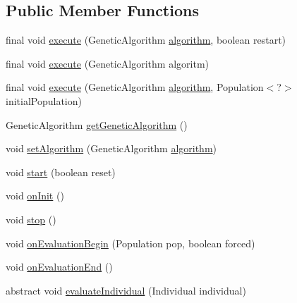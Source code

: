 \subsection*{Public Member Functions}
\begin{CompactItemize}
\item 
final void \hyperlink{classjenes_1_1utils_1_1multitasking_1_1_runner_24d074cbd5140cd8bc65623fa1961f39}{execute} (GeneticAlgorithm \hyperlink{classjenes_1_1utils_1_1multitasking_1_1_runner_699ccf526b6116f97abc09e4ce390c89}{algorithm}, boolean restart)
\item 
final void \hyperlink{classjenes_1_1utils_1_1multitasking_1_1_runner_e222d69f44508fc432c05074272e0ae3}{execute} (GeneticAlgorithm algoritm)
\item 
final void \hyperlink{classjenes_1_1utils_1_1multitasking_1_1_runner_7205f2d93d68f40e3e87dccf92cc3720}{execute} (GeneticAlgorithm \hyperlink{classjenes_1_1utils_1_1multitasking_1_1_runner_699ccf526b6116f97abc09e4ce390c89}{algorithm}, Population$<$?$>$ initialPopulation)
\item 
GeneticAlgorithm \hyperlink{classjenes_1_1utils_1_1multitasking_1_1_runner_462a121a840bbf06593bbd7da219d8b9}{getGeneticAlgorithm} ()
\item 
void \hyperlink{classjenes_1_1utils_1_1multitasking_1_1_runner_dad9fb400d736e55bcd3dfdf07742437}{setAlgorithm} (GeneticAlgorithm \hyperlink{classjenes_1_1utils_1_1multitasking_1_1_runner_699ccf526b6116f97abc09e4ce390c89}{algorithm})
\item 
void \hyperlink{classjenes_1_1utils_1_1multitasking_1_1_runner_5dc1ed49495150ff26ec5194010b00e4}{start} (boolean reset)
\item 
void \hyperlink{classjenes_1_1utils_1_1multitasking_1_1_runner_4c4d4a0cd7aec110d60da5c660903398}{onInit} ()
\item 
void \hyperlink{classjenes_1_1utils_1_1multitasking_1_1_runner_c89e8ac54daba2e326e687662ff9f7b0}{stop} ()
\item 
void \hyperlink{classjenes_1_1utils_1_1multitasking_1_1_runner_6ec13cf0fb2ff03461a3a397421505cf}{onEvaluationBegin} (Population pop, boolean forced)
\item 
void \hyperlink{classjenes_1_1utils_1_1multitasking_1_1_runner_82c84ad942296d62849248b107ec3a2c}{onEvaluationEnd} ()
\item 
abstract void \hyperlink{classjenes_1_1utils_1_1multitasking_1_1_runner_250c5e0ffdb86ef0bb0e78e625a449e7}{evaluateIndividual} (Individual individual)
\end{CompactItemize}
